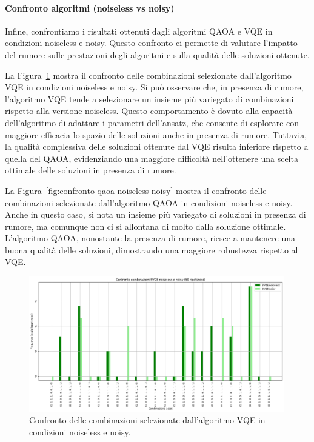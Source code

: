 \paragraph{Confronto algoritmi (noiseless vs noisy)}
Infine, confrontiamo i risultati ottenuti dagli algoritmi QAOA e VQE in 
condizioni noiseless e noisy. Questo confronto ci permette di valutare l'impatto 
del rumore sulle prestazioni degli algoritmi e sulla qualità delle soluzioni ottenute.

La Figura~\ref{fig:confronto-svqe-noiseless-noisy} mostra il confronto delle combinazioni selezionate 
dall'algoritmo VQE in condizioni noiseless e noisy. Si può osservare che, in presenza 
di rumore, l'algoritmo VQE tende a selezionare un insieme più variegato di combinazioni 
rispetto alla versione noiseless. Questo comportamento è dovuto alla capacità 
dell'algoritmo di adattare i parametri dell'ansatz, che consente di esplorare con 
maggiore efficacia lo spazio delle soluzioni anche in presenza di rumore. Tuttavia, 
la qualità complessiva delle soluzioni ottenute dal VQE risulta inferiore rispetto a 
quella del QAOA, evidenziando una maggiore difficoltà nell'ottenere una scelta ottimale 
delle soluzioni in presenza di rumore.

La Figura~\ref{fig:confronto-qaoa-noiseless-noisy} mostra il confronto delle combinazioni selezionate 
dall'algoritmo QAOA in condizioni noiseless e noisy. Anche in questo caso, si nota un 
insieme più variegato di soluzioni in presenza di rumore, ma comunque non ci si 
allontana di molto dalla soluzione ottimale. L'algoritmo QAOA, nonostante la presenza 
di rumore, riesce a mantenere una buona qualità delle soluzioni, dimostrando una 
maggiore robustezza rispetto al VQE.

\begin{figure}[ht!]
    \centering
    \includegraphics[width=0.99\textwidth]{images/risultati/confronto-svqe.png}
    \caption{Confronto delle combinazioni selezionate dall'algoritmo VQE in condizioni noiseless e noisy.}
    \label{fig:confronto-svqe-noiseless-noisy}
\end{figure}


